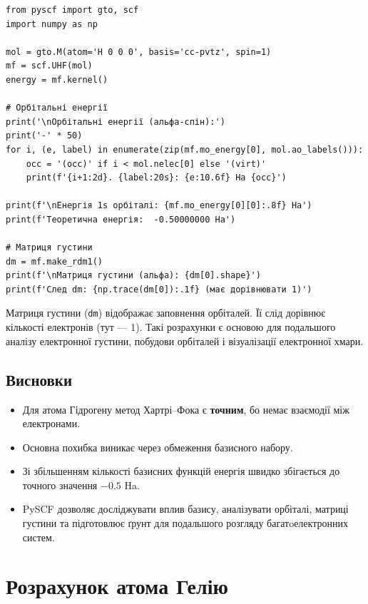 \begin{verbatim}
from pyscf import gto, scf
import numpy as np

mol = gto.M(atom='H 0 0 0', basis='cc-pvtz', spin=1)
mf = scf.UHF(mol)
energy = mf.kernel()

# Орбітальні енергії
print('\nОрбітальні енергії (альфа-спін):')
print('-' * 50)
for i, (e, label) in enumerate(zip(mf.mo_energy[0], mol.ao_labels())):
    occ = '(occ)' if i < mol.nelec[0] else '(virt)'
    print(f'{i+1:2d}. {label:20s}: {e:10.6f} Ha {occ}')

print(f'\nЕнергія 1s орбіталі: {mf.mo_energy[0][0]:.8f} Ha')
print(f'Теоретична енергія:  -0.50000000 Ha')

# Матриця густини
dm = mf.make_rdm1()
print(f'\nМатриця густини (альфа): {dm[0].shape}')
print(f'След dm: {np.trace(dm[0]):.1f} (має дорівнювати 1)')
\end{verbatim}

Матриця густини (\texttt{dm}) відображає заповнення орбіталей. Її слід дорівнює кількості електронів (тут --- 1).
Такі розрахунки є основою для подальшого аналізу електронної густини, побудови орбіталей і візуалізації електронної хмари.

\subsection{Висновки}

\begin{itemize}
    \item Для атома Гідрогену метод Хартрі–Фока є \textbf{точним}, бо немає взаємодії між електронами.
    \item Основна похибка виникає через обмеження базисного набору.
    \item Зі збільшенням кількості базисних функцій енергія швидко збігається до точного значення \(-0.5\) Ha.
    \item PySCF дозволяє досліджувати вплив базису, аналізувати орбіталі, матриці густини та підготовлює ґрунт для подальшого розгляду багатoелектронних систем.
\end{itemize}


\section{Розрахунок атома Гелію}

